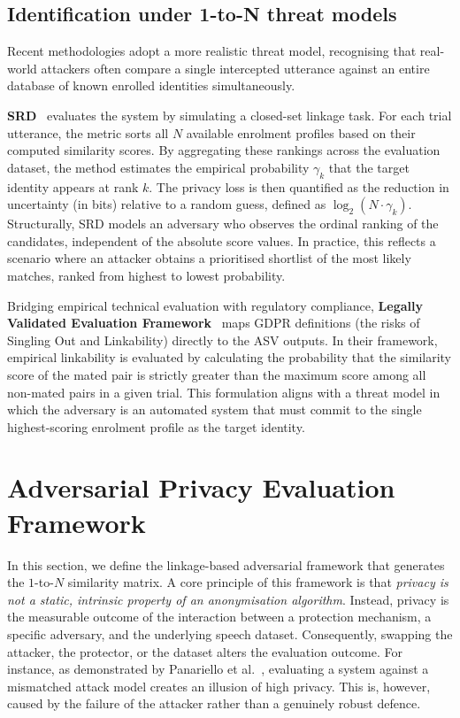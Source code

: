 \subsection{Identification under 1-to-N threat models}

Recent methodologies adopt a more realistic threat model, recognising that real-world attackers often compare a single intercepted utterance against an entire database of known enrolled identities simultaneously.

\textbf{SRD}~\cite{backstrom2026privacy} evaluates the system by simulating a closed-set linkage task. For each trial utterance, the metric sorts all $N$ available enrolment profiles based on their computed similarity scores. By aggregating these rankings across the evaluation dataset, the method estimates the empirical probability $\gamma_k$ that the target identity appears at rank $k$. The privacy loss is then quantified as the reduction in uncertainty (in bits) relative to a random guess, defined as $\log_2(N \cdot \gamma_k)$. Structurally, SRD models an adversary who observes the ordinal ranking of the candidates, independent of the absolute score values. In practice, this reflects a scenario where an attacker obtains a prioritised shortlist of the most likely matches, ranked from highest to lowest probability.

Bridging empirical technical evaluation with regulatory compliance, \textbf{Legally Validated Evaluation Framework}~\cite{vauquier2025legally} maps GDPR definitions (the risks of Singling Out and Linkability) directly to the ASV outputs. In their framework, empirical linkability is evaluated by calculating the probability that the similarity score of the mated pair is strictly greater than the maximum score among all non-mated pairs in a given trial. This formulation aligns with a threat model in which the adversary is an automated system that must commit to the single highest-scoring enrolment profile as the target identity.




\section{Adversarial Privacy Evaluation Framework}

\label{sec:framework}
In this section, we define the linkage-based adversarial framework that generates the $1$-to-$N$ similarity matrix. A core principle of this framework is that \textit{privacy is not a static, intrinsic property of an anonymisation algorithm}. Instead, privacy is the measurable outcome of the interaction between a protection mechanism, a specific adversary, and the underlying speech dataset. Consequently, swapping the attacker, the protector, or the dataset alters the evaluation outcome. For instance, as demonstrated by Panariello et al.~\cite{panariello2025risks}, evaluating a system against a mismatched attack model creates an illusion of high privacy. This is, however, caused by the failure of the attacker rather than a genuinely robust defence.

